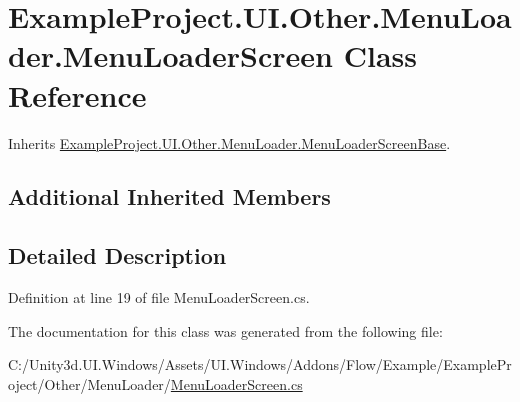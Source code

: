 \hypertarget{class_example_project_1_1_u_i_1_1_other_1_1_menu_loader_1_1_menu_loader_screen}{}\section{Example\+Project.\+U\+I.\+Other.\+Menu\+Loader.\+Menu\+Loader\+Screen Class Reference}
\label{class_example_project_1_1_u_i_1_1_other_1_1_menu_loader_1_1_menu_loader_screen}


Inherits \hyperlink{class_example_project_1_1_u_i_1_1_other_1_1_menu_loader_1_1_menu_loader_screen_base}{Example\+Project.\+U\+I.\+Other.\+Menu\+Loader.\+Menu\+Loader\+Screen\+Base}.

\subsection*{Additional Inherited Members}


\subsection{Detailed Description}


Definition at line 19 of file Menu\+Loader\+Screen.\+cs.



The documentation for this class was generated from the following file\+:\begin{DoxyCompactItemize}
\item 
C\+:/\+Unity3d.\+U\+I.\+Windows/\+Assets/\+U\+I.\+Windows/\+Addons/\+Flow/\+Example/\+Example\+Project/\+Other/\+Menu\+Loader/\hyperlink{_menu_loader_screen_8cs}{Menu\+Loader\+Screen.\+cs}\end{DoxyCompactItemize}
